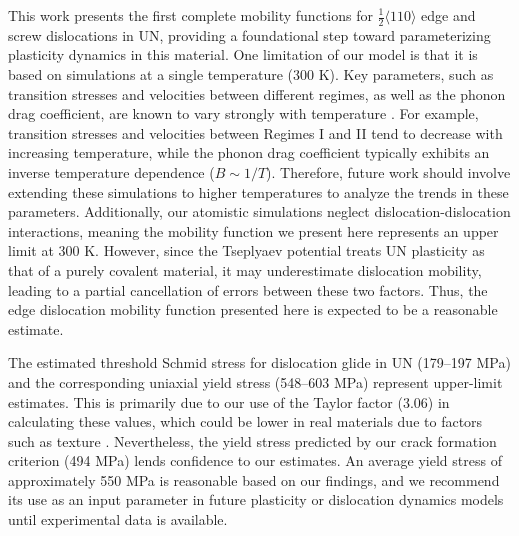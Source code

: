 \documentclass[applsci,article,submit,pdftex,moreauthors]{Definitions/mdpi}
\newcommand{\?}{\stackrel{?}{=}}
\begin{document}
This work presents the first complete mobility functions for $\frac{1}{2}\langle110\rangle$ edge and screw dislocations in UN, providing a foundational step toward parameterizing plasticity dynamics in this material. One limitation of our model is that it is based on simulations at a single temperature (300 K). Key parameters, such as transition stresses and velocities between different regimes, as well as the phonon drag coefficient, are known to vary strongly with temperature \cite{Olmsted2005, Gilbert2011}. For example, transition stresses and velocities between Regimes I and II tend to decrease with increasing temperature, while the phonon drag coefficient typically exhibits an inverse temperature dependence ($B \sim 1/T$). Therefore, future work should involve extending these simulations to higher temperatures to analyze the trends in these parameters. Additionally, our atomistic simulations neglect dislocation-dislocation interactions, meaning the mobility function we present here represents an upper limit at 300 K. However, since the Tseplyaev potential treats UN plasticity as that of a purely covalent material, it may underestimate dislocation mobility, leading to a partial cancellation of errors between these two factors. Thus, the edge dislocation mobility function presented here is expected to be a reasonable estimate. 


The estimated threshold Schmid stress for dislocation glide in UN (179--197 MPa) and the corresponding uniaxial yield stress (548--603 MPa) represent upper-limit estimates. This is primarily due to our use of the Taylor factor (3.06) in calculating these values, which could be lower in real materials due to factors such as texture \cite{Stoller2000}. Nevertheless, the yield stress predicted by our crack formation criterion (494 MPa) lends confidence to our estimates. An average yield stress of approximately 550 MPa is reasonable based on our findings, and we recommend its use as an input parameter in future plasticity or dislocation dynamics models until experimental data is available.
\end{document}
